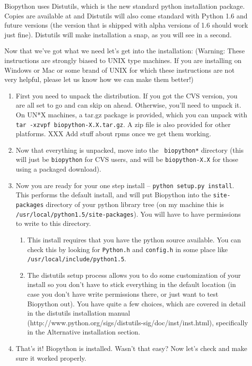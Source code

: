\documentclass{article}
\begin{document}
Biopython uses Distutils, which is the new standard python installation package. Copies are available at  and Distutils will also come standard with Python 1.6 and future versions (the version that is shipped with alpha versions of 1.6 should work just fine). Distutils will make installation a snap, as you will see in a second.


Now that we've got what we need let's get into the installation: (Warning: These instructions are strongly biased to UNIX type machines. If you are installing on Windows or Mac or some brand of UNIX for which these instructions are not very helpful, please let us know how we can make them better!)

\begin{enumerate}

\item First you need to unpack the distribution. If you got the CVS version, you are all set to go and can skip on ahead. Otherwise, you'll need to unpack it. On UN*X machines, a tar.gz package is provided, which you can unpack with \verb|tar -xzvpf biopython-X.X.tar.gz|. A zip file is also provided for other platforms. XXX Add stuff about rpms once we get them working.

\item Now that everything is unpacked, move into the \verb| biopython*| directory (this will just be \verb|biopython| for CVS users, and will be \verb|biopython-X.X| for those using a packaged download). 

\item Now you are ready for your one step install -- \verb|python setup.py install|. This performs the default install, and will put Biopython into the \verb|site-packages| directory of your python library tree (on my machine this is \verb|/usr/local/python1.5/site-packages|). You will have to have permissions to write to this directory. 

\begin{enumerate}

\item This install requires that you have the python source available. You can check this by looking for \verb|Python.h| and \verb|config.h| in some place like \verb|/usr/local/include/python1.5|.

\item The distutils setup process allows you to do some customization of your install so you don't have to stick everything in the default location (in case you don't have write permissions there, or just want to test Biopython out). You have quite a few choices, which are covered in detail in the distutils installation manual (http://www.python.org/sigs/distutils-sig/doc/inst/inst.html), specifically in the Alternative installation section.

\end{enumerate}

\item That's it! Biopython is installed. Wasn't that easy? Now let's check and make sure it worked properly.

\end{enumerate}
\end{document}
